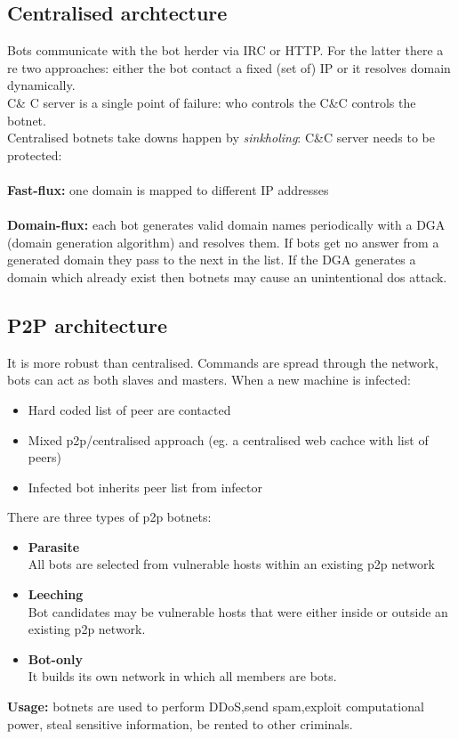 \documentclass[10pt,a4paper]{book}
\begin{document}
\subsection{Centralised archtecture}
Bots communicate with the bot herder via IRC or HTTP. For the latter there a re two approaches: either the bot contact a fixed (set of) IP or it resolves domain dynamically.\\
C\& C server is a single point of failure: who controls the C\&C controls the botnet.\\
Centralised botnets take downs happen by \emph{sinkholing}: C\&C server needs to be protected:\\\\
\textbf{Fast-flux:} one domain is mapped to different IP addresses\\\\
\textbf{Domain-flux:} each bot generates valid domain names periodically with a DGA (domain generation algorithm) and resolves them. If bots get no answer from a generated domain they pass to the next in the list. If the DGA generates a domain which already exist then botnets may cause an unintentional dos attack.
\subsection{P2P architecture}
It is more robust than centralised. Commands are spread through the network, bots can act as both slaves and masters. When a new machine is infected:
\begin{itemize}
\item Hard coded list of peer are contacted
\item Mixed p2p/centralised approach (eg. a centralised web cachce with list of peers)
\item Infected bot inherits peer list from infector
\end{itemize}
There are three types of p2p botnets:
\begin{itemize}
\item \textbf{Parasite}\\
All bots are selected from vulnerable hosts within an existing p2p network
\item \textbf{Leeching}\\
Bot candidates may be vulnerable hosts that were either inside or outside an existing p2p network.
\item \textbf{Bot-only}\\
It builds its own network in which all members are bots.
\end{itemize}
\textbf{Usage:} botnets are used to perform DDoS,send spam,exploit computational power, steal sensitive information, be rented to other criminals.
\end{document}
